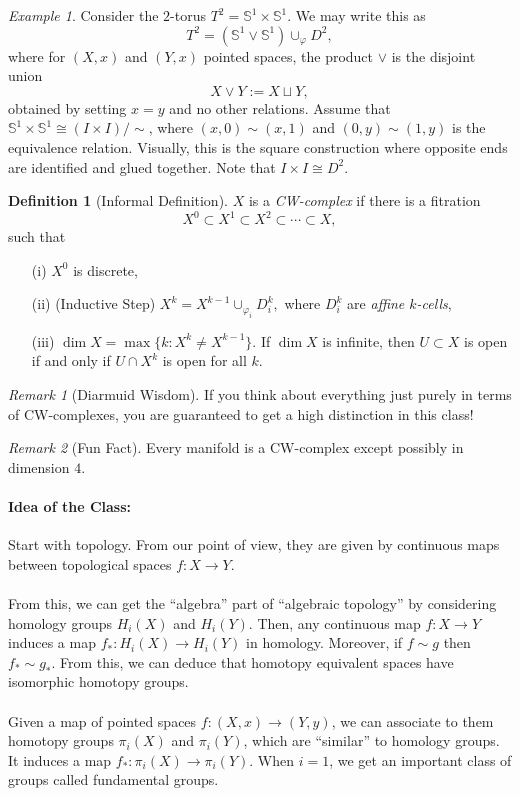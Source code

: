 \documentclass[a4paper]{report}
\theoremstyle{definition}
\newtheorem{definition}{Definition}
\theoremstyle{remark}
\newtheorem{remark}{Remark}
\theoremstyle{proposition}
\theoremstyle{conjecture}
\theoremstyle{lemma}
\theoremstyle{corollary}
\theoremstyle{exercise}
\newtheorem{example}{Example}
\begin{document}
\begin{example}
    Consider the $2$-torus 
    $T^2 = \mathbb{S}^1 \times \mathbb{S}^1$. 
    We may write this as 
    $$T^2 = (\mathbb{S}^1 \vee \mathbb{S}^1) \cup_\varphi D^2,$$
    where for $(X,x)$ and $(Y,x)$ pointed spaces, the product $\vee$ is the disjoint union
    $$X \vee Y := X \sqcup Y,$$
    obtained by setting $x=y$ and no other relations. Assume that 
    $\mathbb{S}^1 \times \mathbb{S}^1 \cong (I\times I)/\sim$,
    where $(x,0) \sim (x,1)$
    and $(0,y) \sim (1,y)$
    is the equivalence relation. Visually, this is the square construction where opposite ends are identified and glued together.
    Note that $I \times I \cong D^2$.
\end{example}

\begin{definition}[Informal Definition]
    $X$ is a \emph{CW-complex} if there is a fitration 
    $$X^0 \subset X^1 \subset X^2 \subset \cdots \subset  X,$$
    such that 
    \begin{itemize}
        \item[(i)] $X^0$ is discrete,
        \item[(ii)] (Inductive Step) $X^k = X^{k-1} \cup_{\varphi_i} D^k_i,$ where 
            $D^k_i$ are \emph{affine $k$-cells},
        \item[(iii)] $\dim X = \max \lbrace k : X^k \neq X^{k-1}\rbrace.$ If $\dim X$ is infinite, then $U\subset X$ is open if and only if $U\cap X^k$ is open for all $k$.
    \end{itemize}
\end{definition}

\begin{remark}[Diarmuid Wisdom]
    If you think about everything just purely in terms of CW-complexes, you are guaranteed to get a high distinction in this class!
\end{remark}

\begin{remark}[Fun Fact]
    Every manifold is a CW-complex except possibly in dimension $4$.
\end{remark}

\paragraph{Idea of the Class:} Start with topology. From our point of view, they are given by continuous maps between topological spaces $f : X \to Y$.\\\\
From this, we can get the ``algebra'' part of ``algebraic topology'' by considering homology groups $H_i(X)$ and $H_i(Y)$. Then, any continuous map $f : X \to Y$ 
induces a map $f_\ast : H_i(X) \to H_i(Y)$ in homology. Moreover,
if $f\sim g$ then $f_\ast \sim g_\ast$. From this, we can deduce that
homotopy equivalent spaces have isomorphic homotopy groups.\\\\
Given a map of pointed spaces 
$f : (X,x) \to (Y,y)$, we can associate to them homotopy groups $\pi_i(X)$ and $\pi_i(Y)$, which are ``similar'' to homology groups. It induces a map 
$f_\ast : \pi_i(X) \to \pi_i(Y)$. When $i=1$, we get an important class of groups called fundamental groups.
\end{document}
